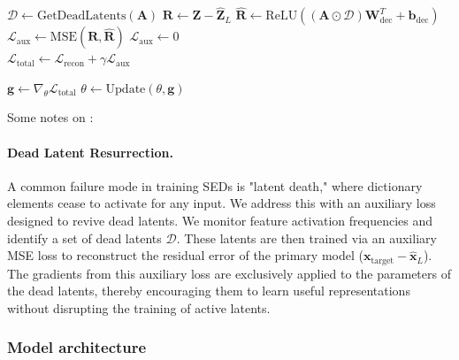 \begin{algorithm}[h]
\begin{algorithmic}[1]
    \Statex {}
    \State $\mathcal{D} \gets \text{GetDeadLatents}(\mathbf{A})$
     
        \State $\mathbf{R} \gets \mathbf{Z} - \hat{\mathbf{Z}}_L$ 
        \State $\hat{\mathbf{R}} \gets \text{ReLU}((\mathbf{A} \odot \mathcal{D}) \mathbf{W}_{\text{dec}}^T + \mathbf{b}_{\text{dec}})$ 
        \State $\mathcal{L}_{\text{aux}} \gets \text{MSE}(\mathbf{R}, \hat{\mathbf{R}})$ 
    \Else
        \State $\mathcal{L}_{\text{aux}} \gets 0$
    \EndIf
    \\
    \State $\mathcal{L}_{\text{total}} \gets \mathcal{L}_{\text{recon}} + \gamma \mathcal{L}_{\text{aux}}$ 

    \Statex {}
    \State $\mathbf{g} \gets \nabla_{\theta} \mathcal{L}_{\text{total}}$ 
    \State $\theta \gets \text{Update}(\theta, \mathbf{g})$ 
\EndProcedure
\end{algorithmic}
\end{algorithm}

Some notes on :

\paragraph{Dead Latent Resurrection.}
A common failure mode in training SEDs is "latent death," where dictionary elements cease to activate for any input. We address this with an auxiliary loss designed to revive dead latents. We monitor feature activation frequencies and identify a set of dead latents $\mathcal{D}$. These latents are then trained via an auxiliary MSE loss to reconstruct the residual error of the primary model ($\mathbf{x}_{\text{target}} - \hat{\mathbf{x}}_L$). The gradients from this auxiliary loss are exclusively applied to the parameters of the dead latents, thereby encouraging them to learn useful representations without disrupting the training of active latents.

\subsubsection{Model architecture}
\label{subsubsection:model_architecture_details}

